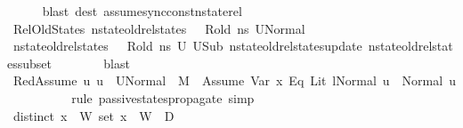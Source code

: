 \begin{isabellebody}
\ \ \ \ \isamarkupfalse%
\ {\isacharparenleft}{\kern0pt}blast\ dest{\isacharcolon}{\kern0pt}\ assume{\isacharunderscore}{\kern0pt}sync{\isacharunderscore}{\kern0pt}const{\isacharunderscore}{\kern0pt}nstate{\isacharunderscore}{\kern0pt}rel{\isacharparenright}{\kern0pt}\isanewline
\ \ \isamarkupfalse%
\ RelOldStates{\isacharcolon}{\kern0pt}\ {\isachardoublequoteopen}nstate{\isacharunderscore}{\kern0pt}old{\isacharunderscore}{\kern0pt}rel{\isacharunderscore}{\kern0pt}states\ {\isasymLambda}\ {\isasymLambda}{\isacharprime}{\kern0pt}\ R{\isacharunderscore}{\kern0pt}old\ ns\ {\isacharquery}{\kern0pt}U{}Normal{\isachardoublequoteclose}\ \isanewline
\ \ \ \ \isamarkupfalse%
\ {\isacartoucheopen}nstate{\isacharunderscore}{\kern0pt}old{\isacharunderscore}{\kern0pt}rel{\isacharunderscore}{\kern0pt}states\ {\isasymLambda}\ {\isasymLambda}{\isacharprime}{\kern0pt}\ R{\isacharunderscore}{\kern0pt}old\ ns\ U{}{\isacartoucheclose}\ U{}Sub\ nstate{\isacharunderscore}{\kern0pt}old{\isacharunderscore}{\kern0pt}rel{\isacharunderscore}{\kern0pt}states{\isacharunderscore}{\kern0pt}update\ nstate{\isacharunderscore}{\kern0pt}old{\isacharunderscore}{\kern0pt}rel{\isacharunderscore}{\kern0pt}states{\isacharunderscore}{\kern0pt}subset\isanewline
\ \ \ \ \ \ \isamarkupfalse%
\ blast\isanewline
\ \ \isamarkupfalse%
\ RedAssume{\isacharcolon}{\kern0pt}\ {\isachardoublequoteopen}{\isasymAnd}u{\isachardot}{\kern0pt}\ u\ {\isasymin}\ {\isacharquery}{\kern0pt}U{}Normal\ {\isasymLongrightarrow}\ M{\isacharcomma}{\kern0pt}{\isasymLambda}{\isacharprime}{\kern0pt}{\isacharcomma}{\kern0pt}{\isasymGamma}{\isacharcomma}{\kern0pt}{\isasymOmega}\ {\isasymturnstile}\ {\isasymlangle}Assume\ {\isacharparenleft}{\kern0pt}{\isacharparenleft}{\kern0pt}Var\ x{}{\isacharparenright}{\kern0pt}\ {\isasymguillemotleft}Eq{\isasymguillemotright}\ {\isacharparenleft}{\kern0pt}Lit\ l{\isacharparenright}{\kern0pt}{\isacharparenright}{\kern0pt}{\isacharcomma}{\kern0pt}Normal\ u{\isasymrangle}\ {\isasymrightarrow}\ Normal\ u{\isachardoublequoteclose}\ \ \ \ \isanewline
\ \ \ \ \isamarkupfalse%
\ {\isacharparenleft}{\kern0pt}rule\ passive{\isacharunderscore}{\kern0pt}states{\isacharunderscore}{\kern0pt}propagate{\isacharunderscore}{\kern0pt}{}{\isacharparenright}{\kern0pt}\ simp\isanewline
\isanewline
\ \ \isamarkupfalse%
\ {\isacartoucheopen}distinct\ {\isacharparenleft}{\kern0pt}x{}\ {\isacharhash}{\kern0pt}\ W{\isacharparenright}{\kern0pt}{\isacartoucheclose}\ {\isacartoucheopen}set\ {\isacharparenleft}{\kern0pt}x{}\ {\isacharhash}{\kern0pt}\ W{\isacharparenright}{\kern0pt}\ {\isasyminter}\ D{}\ {\isacharequal}{\kern0pt}\ {\isacharbraceleft}{\kern0pt}{\isacharbraceright}{\kern0pt}{\isacartoucheclose}\ \isamarkupfalse%

\end{isabellebody}

